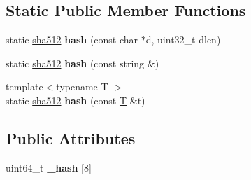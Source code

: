 \subsection*{Static Public Member Functions}
\begin{DoxyCompactItemize}
\item 
\mbox{\label{classfc_1_1sha512_a491433b810e22d6bb8b74d6b75337e8a}} 
static \mbox{\hyperlink{classfc_1_1sha512}{sha512}} {\bfseries hash} (const char $\ast$d, uint32\+\_\+t dlen)
\item 
\mbox{\label{classfc_1_1sha512_adb6fedcf1406535f79ce744ab3b3ade4}} 
static \mbox{\hyperlink{classfc_1_1sha512}{sha512}} {\bfseries hash} (const string \&)
\item 
\mbox{\label{classfc_1_1sha512_a052b5fc57ca6dc3d626ef94a6bddcbd5}} 
{\footnotesize template$<$typename T $>$ }\\static \mbox{\hyperlink{classfc_1_1sha512}{sha512}} {\bfseries hash} (const \mbox{\hyperlink{struct_t}{T}} \&t)
\end{DoxyCompactItemize}
\subsection*{Public Attributes}
\begin{DoxyCompactItemize}
\item 
\mbox{\label{classfc_1_1sha512_acc7b5a4ba9e434d2e208c0718bda5b26}} 
uint64\+\_\+t {\bfseries \+\_\+hash} \mbox{[}8\mbox{]}
\end{DoxyCompactItemize}
